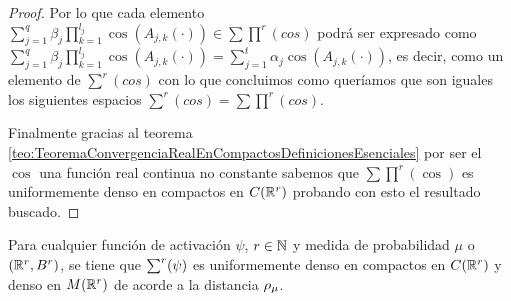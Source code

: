 \begin{proof}
    Por lo que cada elemento 
    $\sum_{j=1}^q \beta_j \prod_{k=1}^{l_j} \cos(A_{j,k}(\cdot)) \in \sum \prod^r(cos)$
    podrá ser expresado como 
    $\sum_{j=1}^q \beta_j \prod_{k=1}^{l_j} \cos(A_{j,k}(\cdot)) = 
    \sum_{j=1}^t \alpha_j \cos(A_{j,k}(\cdot))$, es decir, como un elemento 
    de $\sum^r(cos)$ con lo que concluimos como queríamos que son iguales
    los siguientes espacios
    $\sum^r(cos) = \sum \prod^r(cos)$. 

    Finalmente gracias al teorema \ref{teo:TeoremaConvergenciaRealEnCompactosDefinicionesEsenciales}
    por ser  el $\cos$ una función real continua no constante sabemos que 
    $\sum \prod^r(\cos)$ es uniformemente denso en compactos en $C(\mathbb{R}^r)$ 
    probando con esto el resultado buscado. 
    
\end{proof}

\begin{teorema}
    Para cualquier función de activación $\psi$, $r \in \mathbb{N}$ y
    medida de probabilidad $\mu$ o $(\mathbb{R}^r, B^r)$, 
    se tiene que $\sum^r (\psi)$ es uniformemente denso en compactos
    en $C(\mathbb{R}^r)$ y denso en $M(\mathbb{R}^r)$ de acorde a la distancia $\rho_{\mu}$. 
\end{teorema}
